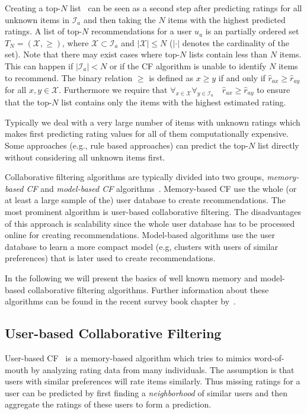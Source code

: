 \documentclass[nojss]{jss}
\newcommand{\set}[1]{\mathcal{#1}}
\begin{document}
Creating a top-$N$ list~\citep{recommender:Sarwar:2001} can
be seen as a second step after predicting ratings for all 
unknown items in $\set{I}_a$
and then taking the $N$ items with the highest predicted ratings.
A list
of top-$N$ recommendations for a user $u_a$ is an partially ordered set 
$T_N = (\set{X}, \ge)$, where 
$\set{X} \subset \set{I}_a$ and
$|\set{X}| \le N$ ($|\cdot|$ denotes the cardinality of the set). 
Note that there may exist cases
where top-$N$ lists contain less than $N$ items. This can happen if 
$|\set{I}_a| < N$ or if the CF algorithm is unable to 
identify $N$ items to recommend.
The binary relation $\ge$ is defined as 
$x\ge y$ if and only if 
$\hat{r}_{ax} \ge
\hat{r}_{ay}$ for all $x,y \in \set{X}$. Furthermore we 
require that $\forall_{x\in \set{X}} \forall_{y\in \set{I}_a} \quad \hat{r}_{ax} \ge \hat{r}_{ay}$ to ensure that the top-$N$ list contains
only the items with the highest estimated rating.

Typically we deal with a very large number of items 
with unknown ratings
which makes first predicting rating values for all of them computationally 
expensive.
Some approaches (e.g., rule based approaches) can
predict the top-$N$ list directly without considering all unknown items first.

Collaborative filtering algorithms are typically divided into two groups,
\emph{memory-based CF} and \emph{model-based CF} 
algorithms~\citep{recommender:Breese:1998}. Memory-based CF
use the whole (or at least a large sample of the) user database to create 
recommendations. The most prominent algorithm is 
user-based collaborative filtering. 
The disadvantages of this approach is scalability since the whole
user database has to be processed online for creating recommendations.
Model-based algorithms 
use the user database to learn a more compact model (e.g, clusters
with users of similar preferences) that is later used to create
recommendations.

In the following we will present the basics of well known memory and model-based
collaborative filtering algorithms. Further information about 
these algorithms can be found in the recent 
survey book chapter by~\cite{recommender:Desrosiers:2011}.

\subsection{User-based Collaborative Filtering}

User-based CF~\citep{recommender:Goldberg:1992,Resnick:1994,recommender:Shardanand:1995} is
a memory-based algorithm which tries to mimics word-of-mouth by analyzing
rating data from many individuals. The assumption is that 
users with similar preferences will rate items similarly. Thus
missing ratings for a user can be predicted by first 
finding a \emph{neighborhood} of similar users and then aggregate the 
ratings of these users to form a prediction.
\end{document}
